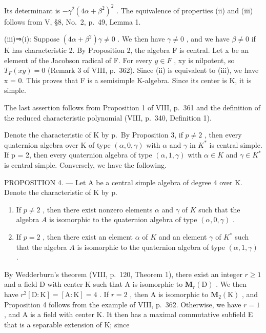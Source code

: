 Its determinant is \(-\gamma^{2}(4\alpha + \beta^{2})^{2}\) . The equivalence of properties (ii) and (iii) follows from V, §8, No.~2, p.~49, Lemma 1.

(iii)⇒(i): Suppose \((4\alpha + \beta^{2})\gamma \neq 0\) . We then have \(\gamma \neq 0\) , and we have \(\beta \neq 0\) if K has characteristic 2. By Proposition 2, the algebra F is central. Let x be an element of the Jacobson radical of F. For every \(y \in F\) , xy is nilpotent, so \(T_{F}(xy) = 0\) (Remark 3 of VIII, p.~362). Since (ii) is equivalent to (iii), we have x = 0. This proves that F is a semisimple K-algebra. Since its center is K, it is simple.

The last assertion follows from Proposition 1 of VIII, p.~361 and the definition of the reduced characteristic polynomial (VIII, p.~340, Definition 1).

Denote the characteristic of K by p.~By Proposition 3, if \(p \neq 2\) , then every quaternion algebra over K of type \((\alpha, 0, \gamma)\) with \(\alpha\) and \(\gamma\) in \(K^{*}\) is central simple. If p = 2, then every quaternion algebra of type \((\alpha, 1, \gamma)\) with \(\alpha \in K\) and \(\gamma \in K^{*}\) is central simple. Conversely, we have the following.

PROPOSITION 4. --- Let A be a central simple algebra of degree 4 over K. Denote the characteristic of K by p.

\begin{enumerate}
\def\labelenumi{\alph{enumi})}
\item
  If \(p \neq 2\) , then there exist nonzero elements \(\alpha\) and \(\gamma\) of \(K\) such that the algebra \(A\) is isomorphic to the quaternion algebra of type \((\alpha, 0, \gamma)\) .
\item
  If \(p = 2\) , then there exist an element \(\alpha\) of \(K\) and an element \(\gamma\) of \(K^*\) such that the algebra \(A\) is isomorphic to the quaternion algebra of type \((\alpha, 1, \gamma)\) .
\end{enumerate}

By Wedderburn's theorem (VIII, p.~120, Theorem 1), there exist an integer \(r \geqslant 1\) and a field D with center K such that A is isomorphic to \(\mathbf{M}_r(\mathrm{D})\) . We then have \(r^2[\mathrm{D}:\mathrm{K}] = [\mathrm{A}:\mathrm{K}] = 4\) . If \(r = 2\) , then A is isomorphic to \(\mathbf{M}_2(\mathrm{K})\) , and Proposition 4 follows from the example of VIII, p.~362. Otherwise, we have \(r = 1\) , and A is a field with center K. It then has a maximal commutative subfield E that is a separable extension of K; since

